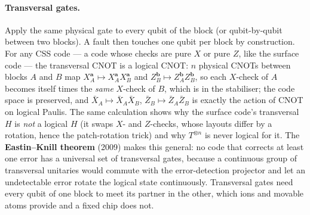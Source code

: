 \paragraph{Transversal gates.} Apply the same physical gate to every qubit of the block (or
qubit-by-qubit between two blocks). A fault then touches one qubit per block by construction.
For any CSS code --- a code whose checks are pure $X$ or pure $Z$, like the surface code ---
the transversal CNOT is a logical CNOT: $n$ physical CNOTs between blocks $A$ and $B$ map
$X_A^{\mathbf a}\mapsto X_A^{\mathbf a}X_B^{\mathbf a}$ and $Z_B^{\mathbf b}\mapsto Z_A^{\mathbf b}Z_B^{\mathbf b}$,
so each $X$-check of $A$ becomes itself times the \emph{same} $X$-check of $B$, which is in the
stabiliser; the code space is preserved, and $\bar X_A\mapsto\bar X_A\bar X_B$,
$\bar Z_B\mapsto\bar Z_A\bar Z_B$ is exactly the action of CNOT on logical Paulis. The same
calculation shows why the surface code's transversal $H$ is \emph{not} a logical $H$ (it swaps
$X$- and $Z$-checks, whose layouts differ by a rotation, hence the patch-rotation trick) and why
$T^{\otimes n}$ is never logical for it. The \textbf{Eastin--Knill theorem} (2009) makes this
general: no code that corrects at least one error has a universal set of transversal gates,
because a continuous group of transversal unitaries would commute with the error-detection
projector and let an undetectable error rotate the logical state continuously. Transversal gates
need every qubit of one block to meet its partner in the other, which ions and movable atoms
provide and a fixed chip does not.

